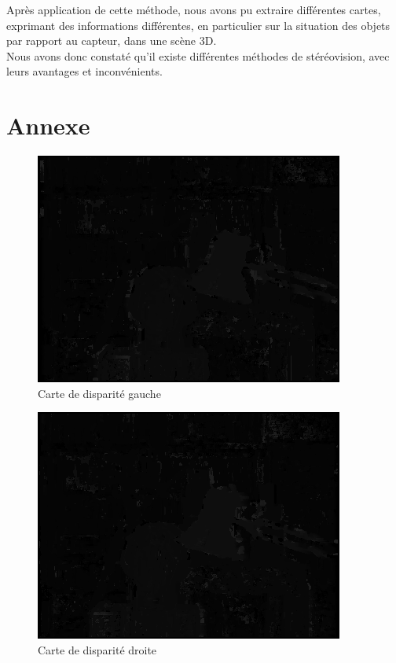 \documentclass[a4paper]{article}
\begin{document}
Après application de cette méthode, nous avons pu extraire différentes cartes, exprimant des informations différentes, en particulier sur la situation des objets par rapport au capteur, dans une scène 3D. \\
Nous avons donc constaté qu'il existe différentes méthodes de stéréovision, avec leurs avantages et inconvénients.

\clearpage

\section{Annexe}

\begin{figure}[h]
\begin{center}
	\includegraphics{left-disparity.png}
\end{center}
\caption{Carte de disparité gauche}
\end{figure}

\begin{figure}[h]
\begin{center}
	\includegraphics{right-disparity.png}
\end{center}
\caption{Carte de disparité droite}
\end{figure}
\end{document}
